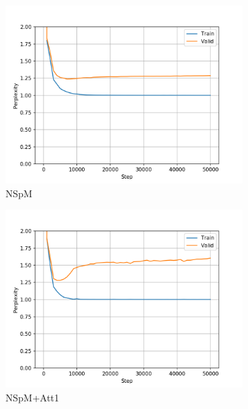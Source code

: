 \begin{figure}[h]
\centering
\begin{subfigure}{0.3\textwidth}
\includegraphics[width=\textwidth]{../results/monument2_2/run1/neural_sparql_machine/ppls.png} 
\caption{NSpM}
\label{fig:monu2 nsm ppl}
\end{subfigure}
\hfill
\begin{subfigure}{0.3\textwidth}
\includegraphics[width=\textwidth]{../results/monument2_2/run1/neural_sparql_machine_bahdanau_attention/ppls.png}
\caption{NSpM+Att1}
\label{fig:monu2 nsm-bah ppl}
\end{subfigure}
\hfill
\begin{subfigure}{0.3\textwidth}

\end{subfigure}
\end{figure}
